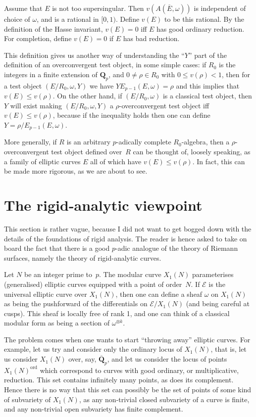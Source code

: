 \documentclass{article}
\newcommand{\E}{\mathcal E}
\newcommand{\Ebar}{\overline{E}}
\newcommand{\Q}{\mathbf{Q}}
\newcommand{\Qpbar}{\overline{\Q}_p}
\begin{document}
Assume that $E$ is not too supersingular. Then $v(A(\Ebar,\omega))$
is independent of choice of $\omega$, and is a rational in $[0,1)$.
Define $v(E)$ to be this rational. By the definition of the Hasse
invariant, $v(E)=0$ iff $E$ has good
ordinary reduction. For completion, define $v(E)=0$ if $E$
has bad reduction.

This definition gives us another way of understanding the ``$Y$''
part of the definition of an overconvergent test object, in some
simple cases: if $R_0$ is the integers in a finite extension of $\Q_p$,
and $0\not=\rho\in R_0$ with $0\leq v(\rho)<1$, then for a test
object $(E/R_0,\omega,Y)$ we have $YE_{p-1}(E,\omega)=\rho$
and this implies that $v(E)\leq v(\rho)$. On the other hand,
if $(E/R_0,\omega)$ is a classical test object, then $Y$ will
exist making $(E/R_0,\omega,Y)$ a $\rho$-overconvergent test object
iff $v(E)\leq v(\rho)$, because if the inequality holds then one
can define $Y=\rho/E_{p-1}(E,\omega)$. 

More generally, if $R$ is an arbitrary $p$-adically complete $R_0$-algebra,
then a $\rho$-overconvergent test object defined over~$R$ can be thought
of, loosely speaking, as a family of elliptic curves $E$ all of
which have $v(E)\leq v(\rho)$. In fact, this can be made more rigorous,
as we are about to see.

\section{The rigid-analytic viewpoint}

This section is rather vague, because I did not want to get bogged down
with the details of the foundations of rigid analysis. The reader is
hence asked to take on board the fact that there is a good $p$-adic
analogue of the theory of Riemann surfaces, namely the theory of
rigid-analytic curves.

Let $N$ be an integer prime to~$p$.
The modular curve $X_1(N)$ parameterises (generalised) elliptic curves
equipped with a point of order~$N$. If $\E$ is the universal elliptic
curve over $X_1(N)$, then one can define a sheaf $\omega$ on $X_1(N)$
as being the pushforward of the differentials on $\E/X_1(N)$ (and being
careful at cusps). This sheaf is locally free of rank 1, and one can
think of a classical modular form as being a section of $\omega^{\otimes k}$.

The problem comes when one wants to start ``throwing away'' elliptic curves.
For example, let us try and consider only the ordinary locus of $X_1(N)$,
that is, let us consider $X_1(N)$ over, say, $\Qpbar$, and let us consider
the locus of points $X_1(N)^{\mathrm{ord}}$
which correspond to curves with good ordinary,
or multiplicative, reduction. This set contains infinitely many points,
as does its complement. Hence there is no way that this set can possibly
be the set of points of some kind of subvariety of $X_1(N)$, as any
non-trivial closed subvariety of a curve is finite, and any non-trivial
open subvariety has finite complement.
\end{document}
